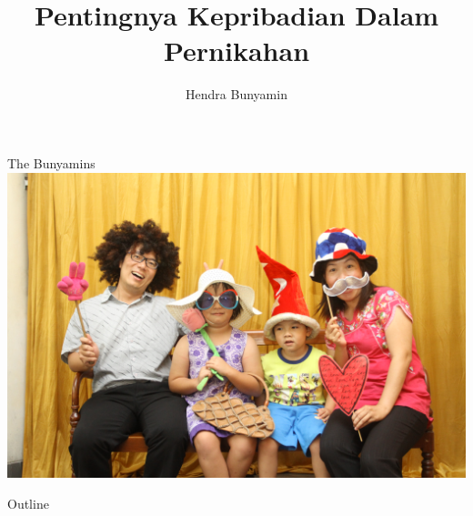 \documentclass{beamer}
\title[Pentingnya Kepribadian Dalam Pernikahan] %
{\textbf{Pentingnya Kepribadian Dalam Pernikahan}}
\author[Hendra Bunyamin] %
{Hendra Bunyamin}
\institute[ ] %
{
  \hfill \break
  \hfill \break 
  \hfill \break
  \hfill \break
  \large
  Bimbingan Pranikah\\
  GKI Anugerah
}
\theoremstyle{mystyle}
\begin{document}
\begin{frame}
  \titlepage
\end{frame}

\begin{frame}{The Bunyamins}
	\centering
	\includegraphics[scale=.125]{images/family-gullit}
\end{frame}

\begin{frame}{Outline}
  \tableofcontents
\end{frame}





\end{document}
